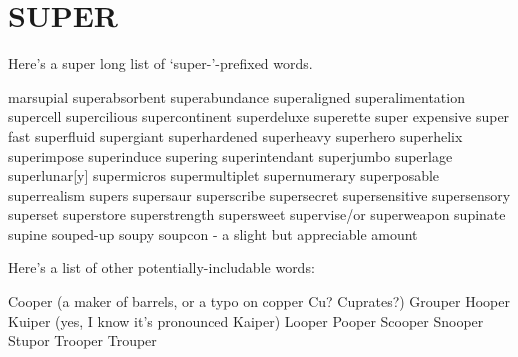 \section{SUPER}
Here's a super long list of `super-'-prefixed words.

marsupial
superabsorbent
superabundance
superaligned
superalimentation
supercell
supercilious
supercontinent
superdeluxe
superette
super expensive
super fast
superfluid
supergiant
superhardened
superheavy
superhero
superhelix
superimpose
superinduce
supering
superintendant
superjumbo
superlage
superlunar[y]
supermicros
supermultiplet
supernumerary
superposable
superrealism
supers
supersaur
superscribe
supersecret
supersensitive
supersensory
superset
superstore
superstrength
supersweet
supervise/or
superweapon
supinate
supine
souped-up
soupy
soupcon - a slight but appreciable amount

Here's a list of other potentially-includable words:

Cooper (a maker of barrels, or a typo on copper Cu?  Cuprates?)
Grouper
Hooper
Kuiper (yes, I know it's pronounced Kaiper)
Looper
Pooper
Scooper
Snooper
Stupor
Trooper
Trouper